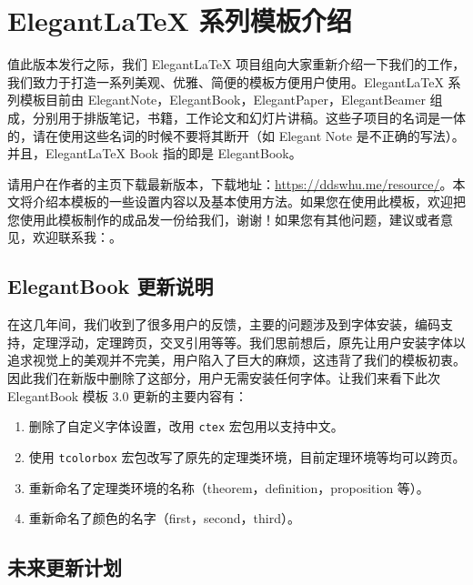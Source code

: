 \documentclass{elegantbook}
\author{ddswhu \& Liam Huang}
\begin{document}
\maketitle
\tableofcontents
\mainmatter
\chapter{Elegant\LaTeX{} 系列模板介绍}

值此版本发行之际，我们 Elegant\LaTeX{} 项目组向大家重新介绍一下我们的工作，我们致力于打造一系列美观、优雅、简便的模板方便用户使用。Elegant\LaTeX{} 系列模板目前由 ElegantNote，ElegantBook，ElegantPaper，ElegantBeamer 组成，分别用于排版笔记，书籍，工作论文和幻灯片讲稿。这些子项目的名词是一体的，请在使用这些名词的时候不要将其断开（如 Elegant Note 是不正确的写法）。并且，Elegant\LaTeX{}  Book 指的即是 ElegantBook。

请用户在作者的主页下载最新版本，下载地址：\href{https://ddswhu.me/resource/}{https://ddswhu.me/resource/}。本文将介绍本模板的一些设置内容以及基本使用方法。如果您在使用此模板，欢迎把您使用此模板制作的成品发一份给我们，谢谢！如果您有其他问题，建议或者意见，欢迎联系我：。


\section{ElegantBook 更新说明}
在这几年间，我们收到了很多用户的反馈，主要的问题涉及到字体安装，编码支持，定理浮动，定理跨页，交叉引用等等。我们思前想后，原先让用户安装字体以追求视觉上的美观并不完美，用户陷入了巨大的麻烦，这违背了我们的模板初衷。因此我们在新版中删除了这部分，用户无需安装任何字体。让我们来看下此次 ElegantBook 模板 3.0 更新的主要内容有：

\begin{enumerate}[noitemsep]
   \item 删除了自定义字体设置，改用 \texttt{ctex} 宏包用以支持中文。
   \item 使用 \texttt{tcolorbox} 宏包改写了原先的定理类环境，目前定理环境等均可以跨页。
   \item 重新命名了定理类环境的名称（theorem，definition，proposition 等）。
   \item 重新命名了颜色的名字（first，second，third）。
\end{enumerate}

\section{未来更新计划}
\end{document}
